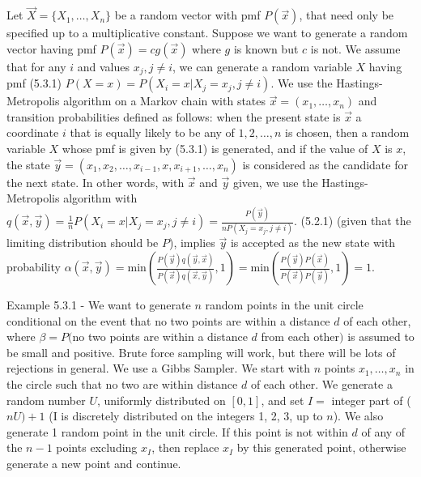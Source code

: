 \documentclass{article}
\begin{document}
Let $\vec{X} = \{X_1, \dots, X_n\}$ be a random vector with pmf $P(\vec{x})$, that need only be specified up to a multiplicative constant. Suppose we want to generate a random vector having pmf $P(\vec{x}) = c g(\vec{x})$ where $g$ is known but $c$ is not. We assume that for any $i$ and values $x_j, j \ne i$, we can generate a random variable $X$ having pmf (5.3.1) $P(X = x) = P(X_i = x | X_j = x_j, j \ne i)$. We use the Hastings-Metropolis algorithm on a Markov chain with states $\vec{x} = (x_1, \dots, x_n)$ and transition probabilities defined as follows: when the present state is $\vec{x}$ a coordinate $i$ that is equally likely to be any of $1, 2, \dots, n$ is chosen, then a random variable $X$ whose pmf is given by (5.3.1) is generated, and if the value of $X$ is $x$, the state $\vec{y} = (x_1, x_2, \dots, x_{i-1}, x, x_{i+1}, \dots, x_n)$ is considered as the candidate for the next state. In other words, with $\vec{x}$ and $\vec{y}$ given, we use the Hastings-Metropolis algorithm with $q(\vec{x}, \vec{y}) = \frac{1}{n} P(X_i = x | X_j = x_j, j \ne i) = \frac{P(\vec{y})}{n P(X_j = x_j, j \ne i)}$. (5.2.1) (given that the limiting distribution should be $P$), implies $\vec{y}$ is accepted as the new state with probability $\alpha(\vec{x}, \vec{y}) = \mathrm{min}(\frac{P(\vec{y}) q(\vec{y}, \vec{x})}{P(\vec{x}) q(\vec{x}, \vec{y})}, 1) = \mathrm{min}(\frac{P(\vec{y}) P(\vec{x})}{P(\vec{x}) P(\vec{y})}, 1) = 1$.

Example 5.3.1 - We want to generate $n$ random points in the unit circle conditional on the event that no two points are within a distance $d$ of each other, where $\beta = P($no two points are within a distance $d$ from each other$)$ is assumed to be small and positive. Brute force sampling will work, but there will be lots of rejections in general. We use a Gibbs Sampler. We start with $n$ points $x_1, \dots, x_n$ in the circle such that no two are within distance $d$ of each other. We generate a random number $U$, uniformly distributed on $[0, 1]$, and set $I =$ integer part of ($nU) + 1$ (I is discretely distributed on the integers 1, 2, 3, up to $n$). We also generate 1 random point in the unit circle. If this point is not within $d$ of any of the $n-1$ points excluding $x_I$, then replace $x_I$ by this generated point, otherwise generate a new point and continue.
\end{document}
